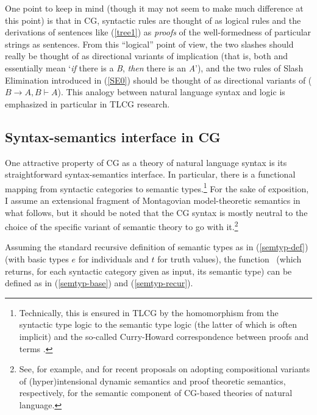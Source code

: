 \documentclass[output=paper
                ,modfonts
                ,nonflat
	        ,collection
	        ,collectionchapter
	        ,collectiontoclongg
 	        ,biblatex
                ,babelshorthands
                ,newtxmath
                ,draftmode
                ,colorlinks, citecolor=brown
]{./langsci/langscibook}
\begin{document}
One point to keep in mind (though it may not seem to make much
difference at this point) is that in CG, syntactic rules are
thought of as logical rules and the derivations of sentences like
(\ref{tree1}) as \emph{proofs} of the well-formedness of
particular strings as sentences.
From this ``logical'' point of view, the two slashes should really be
thought of as directional variants of implication (that is, both
 and  essentially mean `\emph{if} there is a \textit{B},
\emph{then} there is an \textit{A}'), and the two rules of Slash Elimination
introduced in (\ref{SE0})
should be thought of as directional variants of 
($B \ensuremath{ \rightarrow } A, B  \ensuremath{\vdash\xspace } A$). This analogy between natural language
syntax and logic is emphasized in particular in TLCG research.


\subsection{Syntax-semantics interface in CG \label{interface}}

One attractive property of CG as a theory of natural language syntax
is its straightforward syntax-semantics
interface. In particular, there is a 
functional mapping from syntactic categories to semantic
types.\footnote{Technically, this is ensured in TLCG by the 
homomorphism from the syntactic type logic to the semantic type logic
(the latter of which is often implicit) and the so-called Curry-Howard
correspondence between proofs and terms \citep{vanBenthem88}.}
For the sake of exposition, I assume an extensional fragment of
Montagovian model-theoretic semantics in what follows, but it should be noted that the
CG syntax is mostly neutral to the choice of the specific variant of
semantic theory to go with it.\footnote{See,  for example,  \citet{martin2013} and
\citet{bekkimineshima17} for recent proposals on adopting compositional variants
of (hyper)intensional dynamic semantics and proof theoretic semantics,
respectively, for the semantic component of CG-based theories of
natural language.}

Assuming the standard recursive definition of semantic types
as in (\ref{semtyp-def}) (with basic types $e$ for
individuals and $t$ for truth values), the function \SemTyp\ (which returns, for each
syntactic category given as input, its semantic type) can be defined as in
(\ref{semtyp-base}) and (\ref{semtyp-recur}).
\end{document}
